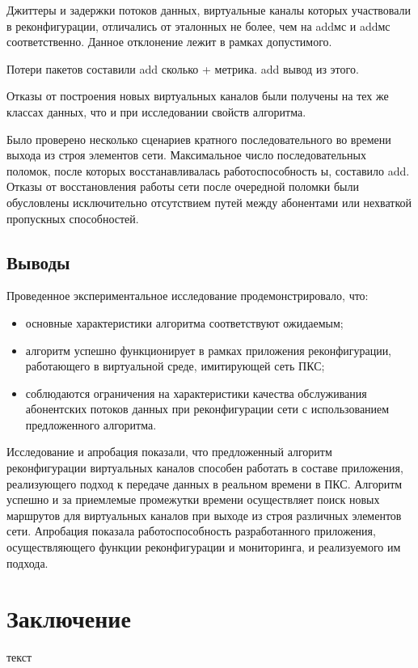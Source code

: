 \documentclass[12pt,fleqn]{article}
\begin{document}
Джиттеры и задержки потоков данных, виртуальные каналы которых участвовали в реконфигурации, отличались от эталонных не более, чем на addмс и addмс соответственно. Данное отклонение лежит в рамках допустимого.

Потери пакетов составили add сколько + метрика. add вывод из этого.

Отказы от построения новых виртуальных каналов были получены на тех же классах данных, что и при исследовании свойств алгоритма.

Было проверено несколько сценариев кратного последовательного во времени выхода из строя элементов сети. Максимальное число последовательных поломок, после которых восстанавливалась работоспособность ы, составило add. Отказы от восстановления работы сети после очередной поломки были обусловлены исключительно отсутствием путей между абонентами или нехваткой пропускных способностей.

\subsection{Выводы}
Проведенное экспериментальное исследование продемонстрировало, что:
\begin{itemize}
	\item основные характеристики алгоритма соответствуют ожидаемым;
	\item алгоритм успешно функционирует в рамках приложения реконфигурации, работающего в виртуальной среде, имитирующей сеть ПКС;
	\item соблюдаются ограничения на характеристики качества обслуживания абонентских потоков данных при реконфигурации сети с использованием предложенного алгоритма.
\end{itemize}

Исследование и апробация показали, что предложенный алгоритм реконфигурации виртуальных каналов способен работать в составе приложения, реализующего подход к передаче данных в реальном времени в ПКС. Алгоритм успешно и за приемлемые промежутки времени осуществляет поиск новых маршрутов для виртуальных каналов при выходе из строя различных элементов сети. Апробация показала работоспособность разработанного приложения, осуществляющего функции реконфигурации и мониторинга, и реализуемого им подхода. 

\section*{Заключение}
текст

\renewcommand{\bibname}{Список литературы}
\end{document}
